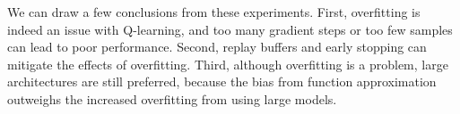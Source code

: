 We can draw a few conclusions from these experiments. First, overfitting is indeed an issue with Q-learning, and too many gradient steps or too few samples can lead to poor performance. Second, replay buffers and early stopping can mitigate the effects of overfitting. Third, although overfitting is a problem, large architectures are still preferred, because the bias from function approximation outweighs the increased overfitting from using large models.